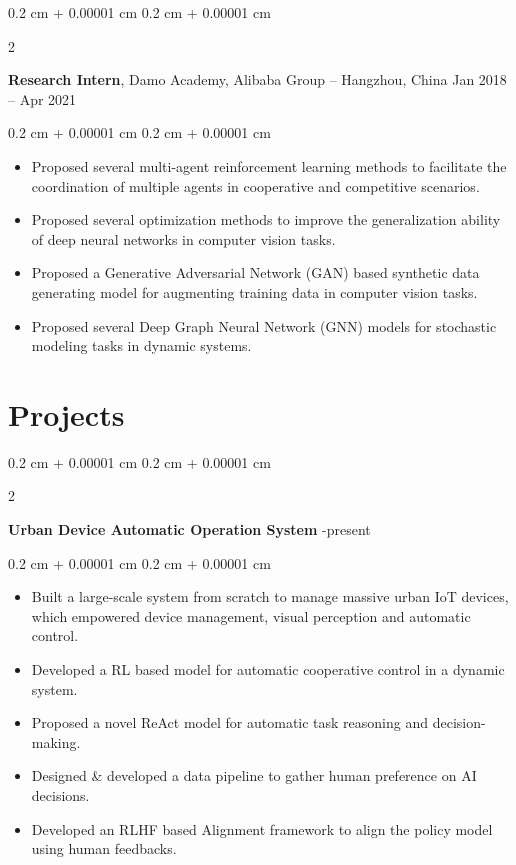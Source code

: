 \documentclass[10pt, letterpaper]{article}
\newenvironment{highlights}{
    \begin{itemize}[
        topsep=0.10 cm,
        parsep=0.10 cm,
        partopsep=0pt,
        itemsep=0pt,
        leftmargin=0.4 cm + 10pt
    ]
}{
    \end{itemize}
} %
\newenvironment{onecolentry}{
    \begin{adjustwidth}{
        0.2 cm + 0.00001 cm
    }{
        0.2 cm + 0.00001 cm
    }
}{
    \end{adjustwidth}
} %
\newenvironment{twocolentry}[2][]{
    \onecolentry
    \def\secondColumn{#2}
    \setcolumnwidth{\fill, 4.5 cm}
    \begin{paracol}{2}
}{
    \switchcolumn \raggedleft \secondColumn
    \end{paracol}
    \endonecolentry
} %
\begin{document}
        \vspace{0.2 cm}

        \begin{twocolentry}{
            Jan 2018 – Apr 2021
        }
            \textbf{Research Intern}, Damo Academy, Alibaba Group -- Hangzhou, China\end{twocolentry}

        \vspace{0.10 cm}
        \begin{onecolentry}
            \begin{highlights}
                \item Proposed several multi-agent reinforcement learning methods to facilitate the coordination of multiple agents in cooperative and competitive scenarios.
                \item Proposed several optimization methods to improve the generalization ability of deep neural networks in computer vision tasks.
                \item Proposed a Generative Adversarial Network (GAN) based synthetic data generating model for augmenting training data in computer vision tasks.
                \item Proposed several Deep Graph Neural Network (GNN) models for stochastic modeling tasks in dynamic systems.
            \end{highlights}
        \end{onecolentry}



    
    \section{Projects}



        
        \begin{twocolentry}{
            2023-present
        }
            \textbf{Urban Device Automatic Operation System}\end{twocolentry}

        \vspace{0.10 cm}
        \begin{onecolentry}
            \begin{highlights}
                \item Built a large-scale system from scratch to manage massive urban IoT devices, which empowered device management, visual perception and automatic control.
                \item Developed a RL based model for automatic cooperative control in a dynamic system.
                \item Proposed a novel ReAct model for automatic task reasoning and decision-making.
                \item Designed \& developed a data pipeline to gather human preference on AI decisions.
                \item Developed an RLHF based Alignment framework to align the policy model using human feedbacks.
            \end{highlights}
        \end{onecolentry}
\end{document}
